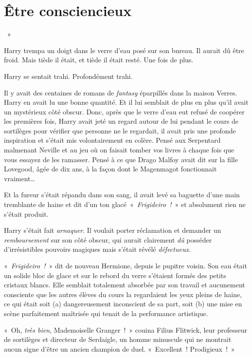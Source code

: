 
\chapter{Être consciencieux}

~»

\hplettrineextrapara
Harry trempa un doigt dans le verre d'eau posé sur son bureau.
Il aurait dû être froid.
Mais tiède il était, et tiède il était resté.
Une fois de plus.

Harry se sentait trahi. Profondément trahi.

Il y avait des centaines de romans de \emph{fantasy} éparpillés dans la maison Verres.
Harry en avait lu une bonne quantité.
Et il lui semblait de plus en plus qu'il avait un mystérieux côté obscur.
Donc, après que le verre d'eau eut refusé de coopérer les premières fois, Harry avait jeté un regard autour de lui pendant le cours de sortilèges pour vérifier que personne ne le regardait, il avait pris une profonde inspiration et s'était mis volontairement en colère.
Pensé aux Serpentard malmenant Neville et au jeu où on faisait tomber vos livres à chaque fois que vous essayez de les ramasser.
Pensé à ce que Drago Malfoy avait dit sur la fille Lovegood, âgée de dix ans, à la façon dont le Magenmagot fonctionnait vraiment…

Et la fureur s'était répandu dans son sang, il avait levé sa baguette d'une main tremblante de haine et dit d'un ton glacé~«~\emph{Frigideiro~!}~» et absolument rien ne s'était produit.

Harry s'était fait \emph{arnaquer}.
Il voulait porter réclamation et demander un \emph{remboursement} sur son côté obscur, qui aurait clairement \emph{dû} posséder d'irrésistibles pouvoirs magiques mais s'était révélé \emph{défectueux}.

«~\emph{Frigideiro~!}~» dit de nouveau Hermione, depuis le pupitre voisin.
Son eau était un solide bloc de glace et sur le rebord du verre s'étaient formés des petits cristaux blancs.
Elle semblait totalement absorbée par son travail et aucunement consciente que les autres élèves du cours la regardaient les yeux pleins de haine, ce qui était soit (a) dangereusement inconscient de sa part, soit (b) une mise en scène parfaitement maîtrisée qui tenait de la performance artistique.

«~Oh, \emph{très bien}, Mademoiselle Granger~!~» couina Filius Flitwick, leur professeur de sortilèges et directeur de Serdaigle, un homme minuscule qui ne montrait aucun signe d'être un ancien champion de duel.
«~Excellent~! Prodigieux~!~»

